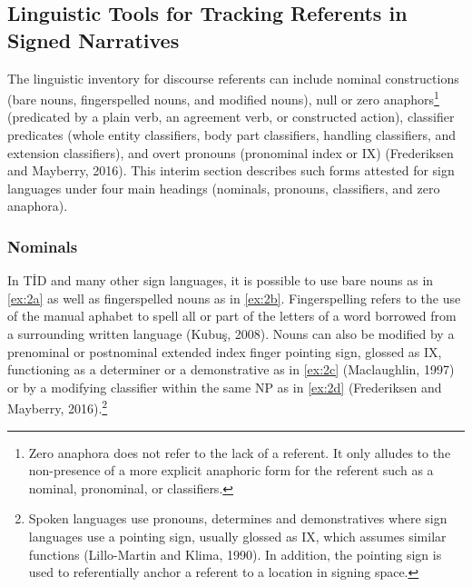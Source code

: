\documentclass[]{elsarticle} %
\begin{document}
\hypertarget{linguistic-tools-for-tracking-referents-in-signed-narratives}{%
\subsection{Linguistic Tools for Tracking Referents in Signed
Narratives}\label{linguistic-tools-for-tracking-referents-in-signed-narratives}}

The linguistic inventory for discourse referents can include nominal
constructions (bare nouns, fingerspelled nouns, and modified nouns),
null or zero
anaphors\footnote{Zero anaphora does not refer to the lack of a referent. It only alludes to the non-presence of a more explicit anaphoric form for the referent such as a nominal, pronominal, or classifiers.}
(predicated by a plain verb, an agreement verb, or constructed action),
classifier predicates (whole entity classifiers, body part classifiers,
handling classifiers, and extension classifiers), and overt pronouns
(pronominal index or IX) (Frederiksen and Mayberry, 2016). This interim
section describes such forms attested for sign languages under four main
headings (nominals, pronouns, classifiers, and zero anaphora).

\hypertarget{nominals}{%
\subsubsection{Nominals}\label{nominals}}

In TİD and many other sign languages, it is possible to use bare nouns
as in \ref{ex:2a} as well as fingerspelled nouns as in \ref{ex:2b}.
Fingerspelling refers to the use of the manual aphabet to spell all or
part of the letters of a word borrowed from a surrounding written
language (Kubuş, 2008). Nouns can also be modified by a prenominal or
postnominal extended index finger pointing sign, glossed as IX,
functioning as a determiner or a demonstrative as in \ref{ex:2c}
(Maclaughlin, 1997) or by a modifying classifier within the same NP as
in \ref{ex:2d} (Frederiksen and Mayberry,
2016).\footnote{Spoken languages use pronouns, determines and demonstratives where sign languages use a pointing sign, usually glossed as IX, which assumes similar functions (Lillo-Martin and Klima, 1990). In addition, the pointing sign is used to referentially anchor a referent to a location in signing space.}
\end{document}
